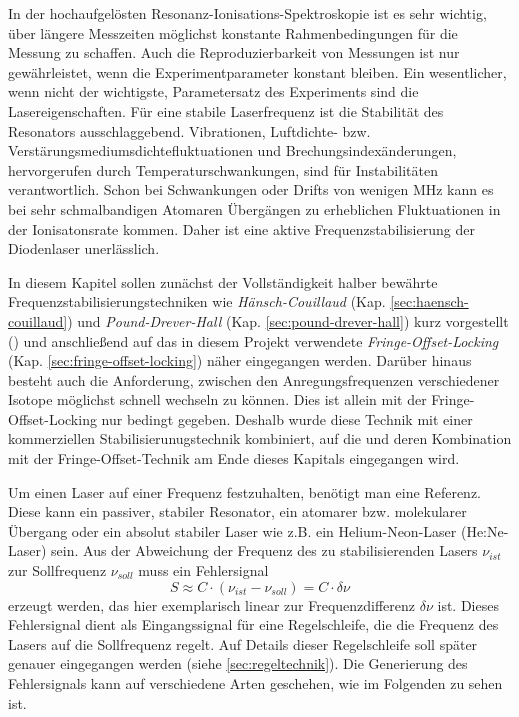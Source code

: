 In der hochaufgelösten Resonanz-Ionisations-Spektroskopie ist es
sehr wichtig, über längere Messzeiten möglichst konstante Rahmenbedingungen für die Messung zu
schaffen. Auch die Reproduzierbarkeit von Messungen ist nur gewährleistet, wenn
die Experimentparameter konstant bleiben. Ein wesentlicher, wenn nicht der
wichtigste, Parametersatz des Experiments sind die Lasereigenschaften. Für
eine stabile Laserfrequenz ist die Stabilität des Resonators ausschlaggebend.
Vibrationen, Luftdichte- bzw. Verstärungsmediumsdichtefluktuationen und
Brechungsindexänderungen, hervorgerufen durch Temperaturschwankungen, sind für
Instabilitäten verantwortlich. Schon bei Schwankungen oder Drifts von wenigen
MHz kann es bei sehr schmalbandigen Atomaren Übergängen zu erheblichen
Fluktuationen in der Ionisatonsrate kommen. Daher ist eine aktive
Frequenzstabilisierung der Diodenlaser unerlässlich.\par
In diesem Kapitel sollen zunächst der Vollständigkeit halber bewährte
Frequenzstabilisierungstechniken wie
\textit{Hänsch-Couillaud} (Kap.
\ref{sec:haensch-couillaud}) und \textit{Pound-Drever-Hall} (Kap.
\ref{sec:pound-drever-hall}) kurz vorgestellt
(\cite{noertershaeuser:physik_des_lasers}) und anschließend auf das
in diesem Projekt verwendete \textit{Fringe-Offset-Locking} (Kap.
\ref{sec:fringe-offset-locking}) näher eingegangen werden. Darüber hinaus
besteht auch die Anforderung, zwischen den Anregungsfrequenzen verschiedener
Isotope möglichst schnell wechseln zu können. Dies ist allein mit der
Fringe-Offset-Locking nur bedingt gegeben. Deshalb wurde diese Technik mit einer
kommerziellen Stabilisierunugstechnik kombiniert, auf die und deren Kombination
mit der Fringe-Offset-Technik am Ende dieses Kapitals eingegangen wird.\par
Um einen Laser auf einer Frequenz festzuhalten, benötigt
man eine Referenz. Diese kann ein passiver, stabiler Resonator, ein atomarer
bzw. molekularer Übergang oder ein absolut stabiler Laser wie z.B. ein
Helium-Neon-Laser (He:Ne-Laser) sein.
Aus der Abweichung der Frequenz des zu stabilisierenden Lasers $\nu_{ist}$ zur
Sollfrequenz $\nu_{soll}$ muss ein Fehlersignal
\begin{equation}\label{eq:servoschleife_fehlersignal}
	S\approx C\cdot(\nu_{ist}-\nu_{soll})=C\cdot\delta\nu
\end{equation}
erzeugt werden, das hier exemplarisch linear zur Frequenzdifferenz $\delta\nu$
ist. Dieses Fehlersignal dient als Eingangssignal für eine Regelschleife, die
die Frequenz des Lasers auf die Sollfrequenz regelt. Auf Details dieser
Regelschleife soll später genauer eingegangen werden (siehe
\ref{sec:regeltechnik}). Die Generierung des Fehlersignals kann auf verschiedene Arten geschehen, wie im Folgenden zu sehen
ist.

